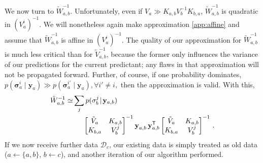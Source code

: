 \documentclass[twoside]{article}
\newcommand{\given}{\!\ensuremath{\mid}\!}
\newcommand{\cm}[1]{\ensuremath{\mathcal{#1}}}
\newcommand{\bm}[1]{\ensuremath{\mathbf{#1}}}
\newcommand{\data}{\ensuremath{\cm{D}}}
\newcommand{\vect}[1]{\bm{#1}}
\newcommand{\vy}{\vect{y}}
\newcommand{\vs}{\vect{\sigma}}
\newcommand{\fPr}{p}
\newcommand{\Prob}[2]{\fPr(#1 \given #2 )}
\newcommand{\tr}{\ensuremath{\mathsf{T}}}
\begin{document}
We now turn to $\tilde{W}_{a,b}^{-1}$. Unfortunately, even if
$V_a \gg K_{a,b} V_b^{-1} K_{b,a}$, $\tilde{W}_{a,b}^{-1}$ is quadratic in
$(V^i_a)^{-1}$. We will nonetheless again make approximation \ref{app:affine} and assume that $\tilde{W}_{a,b}^{-1}$
is affine in $(V^i_a)^{-1}$. The quality of our approximation for
$\tilde{W}_{a,b}^{-1}$ is much less critical than for
$\tilde{V}^{-1}_{a,b}$, because the former only influences the
variance of our predictions for the current predictant; any flaws in
that approximation will not be propagated forward. Further, of course,
if one probability dominates, 
$
\Prob{\vs^i_{a}}{\vy_{a}}\gg
\Prob{\vs^{i'}_{a}}{\vy_{a}}, \forall i' \neq i,
$
then the approximation is valid. With this,
\begin{align*}
\tilde{W}^{-1}_{a,b} \simeq
& \sum_{j} \Prob{\vs^j_{b}}{\vy_{a,b}} 
\\
& \hspace{0.5cm}
\begin{bmatrix}
 \tilde{V}_a & K_{a,b}
\\
 K_{b,a} & V^j_b
\end{bmatrix}^{-1}\vy_{a,b}^{\phantom{\tr}}\, \vy_{a,b}^\tr \begin{bmatrix}
 \tilde{V}_a & K_{a,b}
\\
 K_{b,a} & V^j_b
\end{bmatrix}^{-1}\,.%
\end{align*}
If we now receive further data $\data_c$, our existing data is simply treated as old data ($a \leftarrow \{a,b\}$, $b \leftarrow c$), and another iteration of our algorithm performed.
\end{document}
